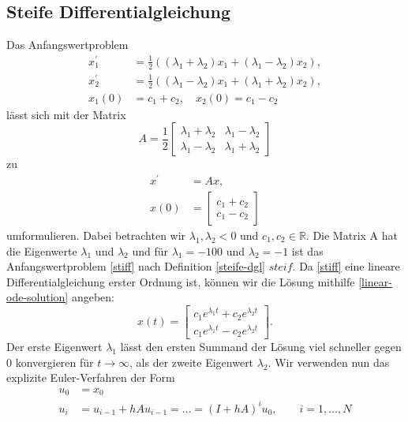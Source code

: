 \subsection{Steife Differentialgleichung}
\label{sec:steife-differentialgleichung}
Das Anfangswertproblem
\begin{align}
       \label{stiff}
       x_{1}^{\prime} &= \frac{1}{2} ((\lambda_1 + \lambda_2)x_1 + (\lambda_1 - \lambda_2)x_2), \nonumber \\
       x_{2}^{\prime} &= \frac{1}{2} ((\lambda_1 - \lambda_2)x_1 + (\lambda_1 + \lambda_2)x_2), \\
       x_1(0) &= c_1 + c_2, \quad x_2(0) = c_1 - c_2 \nonumber
\end{align}
lässt sich mit der Matrix
\[
       A = \frac{1}{2}
       \begin{bmatrix}
                \lambda_1 + \lambda_2 & \lambda_1 - \lambda_2 \\
                \lambda_1 - \lambda_2 & \lambda_1 + \lambda_2
       \end{bmatrix}
\]
zu
\begin{align*}
       x^{\prime} &= Ax, \\
       x(0) &=
       \begin{bmatrix}
              c_1 + c_2 \\
              c_1 - c_2
       \end{bmatrix}
\end{align*}
umformulieren. Dabei betrachten wir $\lambda_1, \lambda_2 < 0$ und $c_1, c_2 \in \mathbb{R}$. Die Matrix A hat die
Eigenwerte $\lambda_1$ und $\lambda_2$ und für $\lambda_1 = -100$ und $\lambda_2 = -1$ ist
das Anfangswertproblem \ref{stiff} nach Definition \eqref{steife-dgl} $steif$. Da \eqref{stiff} eine lineare
Differentialgleichung erster Ordnung ist, können wir die Lösung mithilfe \eqref{linear-ode-solution} angeben:
\[
       x(t) =
       \begin{bmatrix}
              c_1 e^{\lambda_1 t} + c_2 e^{\lambda_2 t} \\
              c_1 e^{\lambda_1 t} - c_2 e^{\lambda_2 t}
       \end{bmatrix}.
\]
Der erste Eigenwert $\lambda_1$ lässt den ersten Summand der Lösung viel schneller gegen $0$ konvergieren für
$t \rightarrow \infty$, als der zweite Eigenwert $\lambda_2$. Wir verwenden nun das explizite Euler-Verfahren der Form
\begin{align*}
       u_0 &= x_0 \\
       u_i &= u_{i-1} + hAu_{i-1}= \dots = (I + hA)^{i}u_0, \qquad i=1,\dots,N
\end{align*}
